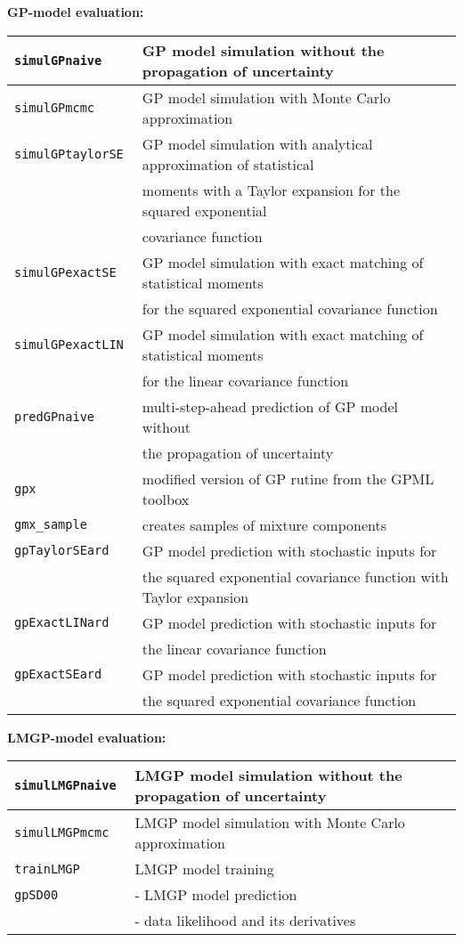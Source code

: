 \documentclass[12pt,twoside]{article}
\newcommand{\fun}[1]{\tt #1}
\begin{document}
{\pagebreak[0]
\textbf{GP-model evaluation:} \\
\begin{tabular}{|l|l|}
 \hline \fun{simulGPnaive} & GP model simulation without the propagation of uncertainty \\
 \hline \fun{simulGPmcmc} & GP model simulation with Monte Carlo approximation\\
 \hline \fun{simulGPtaylorSE} & GP model simulation with analytical approximation of statistical\\
 & moments with a Taylor expansion for the squared exponential\\
 & covariance function\\
 \hline \fun{simulGPexactSE} & GP model simulation with exact matching of statistical moments\\
 &for the squared exponential covariance function \\
 \hline \fun{simulGPexactLIN} & GP model simulation with exact matching of statistical moments\\
 &for the linear covariance function \\
 \hline \fun{predGPnaive} & multi-step-ahead prediction of GP model without\\
 &the propagation of uncertainty\\
 \hline \fun{gpx} & modified version of GP rutine from the GPML toolbox \\
 \hline \fun{gmx\_sample} & creates samples of mixture components \\
 \hline \fun{gpTaylorSEard} & GP model prediction with stochastic inputs for\\ &the squared exponential covariance function with Taylor expansion\\
 \hline \fun{gpExactLINard} & GP model prediction with stochastic inputs for\\ &the linear covariance function \\
 \hline \fun{gpExactSEard} & GP model prediction with stochastic inputs for\\ &the squared exponential covariance function \\
 \hline
%
\end{tabular}

\pagebreak
\textbf{LMGP-model evaluation:} \\
\begin{tabular}{|l|l|}
  \hline \fun{simulLMGPnaive} & LMGP model simulation without the propagation of uncertainty \\
 \hline \fun{simulLMGPmcmc} & LMGP model simulation with Monte Carlo approximation\\
  \hline \fun{trainLMGP} & LMGP model training \\
  \hline \fun{gpSD00} & - LMGP model prediction \\
  & - data likelihood and its derivatives \\
\hline
\end{tabular}

}
\end{document}
